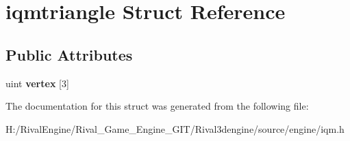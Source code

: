 \hypertarget{structiqmtriangle}{}\section{iqmtriangle Struct Reference}
\label{structiqmtriangle}
\subsection*{Public Attributes}
\begin{DoxyCompactItemize}
\item 
\mbox{\label{structiqmtriangle_a8116f6f302919af8d0f93ae9a84abbf5}} 
uint {\bfseries vertex} \mbox{[}3\mbox{]}
\end{DoxyCompactItemize}


The documentation for this struct was generated from the following file\+:\begin{DoxyCompactItemize}
\item 
H\+:/\+Rival\+Engine/\+Rival\+\_\+\+Game\+\_\+\+Engine\+\_\+\+G\+I\+T/\+Rival3dengine/source/engine/iqm.\+h\end{DoxyCompactItemize}
